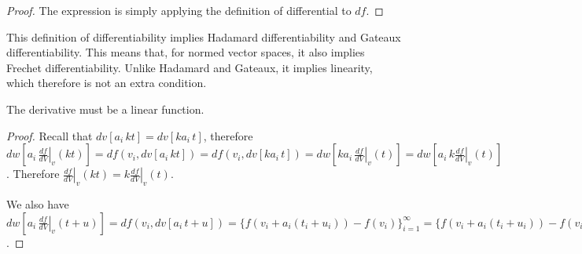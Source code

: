 \begin{proof}
	The expression is simply applying the definition of differential to $df$.
\end{proof}

\begin{remark}
	This definition of differentiability implies Hadamard differentiability and Gateaux differentiability. This means that, for normed vector spaces, it also implies Frechet differentiability. Unlike Hadamard and Gateaux, it implies linearity, which therefore is not an extra condition.
\end{remark}

\begin{prop}
	The derivative must be a linear function.
\end{prop}

\begin{proof}
	Recall that $dv[a_i \, kt] = dv[k a_i \, t]$, therefore $dw[a_i \, \left.\frac{df}{dV} \right|_{v} (kt)] = df(v_i, dv[a_i \, kt]) = df(v_i, dv[ka_i \, t]) = dw[ka_i \, \left.\frac{df}{dV} \right|_{v} (t)] = dw[a_i \, k \left.\frac{df}{dV} \right|_{v} (t)]$. Therefore $\left.\frac{df}{dV} \right|_{v} (kt) = k \left.\frac{df}{dV} \right|_{v} (t)$.
	
	We also have $dw[a_i \, \left.\frac{df}{dV} \right|_{v} (t+u)] = df(v_i, dv[a_i \, t + u]) = \{f(v_i + a_i (t_i + u_i)) - f(v_i)\}_{i=1}^{\infty} = \{f(v_i + a_i (t_i + u_i)) - f(v_i + a_i t_i) + f(v_i + a_i t_i) - f(v_i)\}_{i=1}^{\infty} = \{f((v_i + a_i t_i) + a_i u_i) - f(v_i + a_i t_i)\}_{i=1}^{\infty} + \{f(v_i + a_i t_i) - f(v_i)\}_{i=1}^{\infty} = df(v_i + a_i t_i, dv[a_i \, u]) + df(v_i, dv[a_i \, t]) = dw[a_i \, \left.\frac{df}{dV} \right|_{v} (u)]+dw[a_i \, \left.\frac{df}{dV} \right|_{v} (v)] = dw[a_i \, \left.\frac{df}{dV} \right|_{v} (u) + \left.\frac{df}{dV} \right|_{v} (v)]$.
\end{proof}

